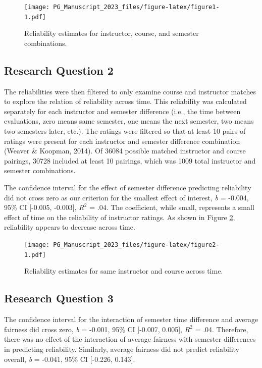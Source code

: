 \documentclass[
  man]{apa7}
\begin{document}
\begin{figure}
\centering
\texttt{[image: PG\_Manuscript\_2023\_files/figure-latex/figure1-1.pdf]}
\caption{\label{fig:figure1}Reliability estimates for instructor, course, and semester combinations.}
\end{figure}

\hypertarget{research-question-2-1}{%
\subsection{Research Question 2}\label{research-question-2-1}}

The reliabilities were then filtered to only examine course and
instructor matches to explore the relation of reliability across time.
This reliability was calculated separately for each instructor and
semester difference (i.e., the time between evaluations, zero means same
semester, one means the next semester, two means two semesters later,
etc.). The ratings were filtered so that at least 10 pairs of ratings
were present for each instructor and semester difference combination
(Weaver \& Koopman, 2014). Of 36084 possible matched instructor and
course pairings,
30728 included at
least 10 pairings, which was 1009 total instructor and
semester combinations.

The confidence interval for the effect of semester difference predicting
reliability did not cross zero as our criterion for the smallest effect
of interest, \emph{b} = -0.004, 95\% CI
{[}-0.005,
-0.003{]}, \(R^2\) =
.04.
The coefficient, while small, represents a small effect of time on the
reliability of instructor ratings. As shown in Figure
\ref{fig:figure2}, reliability appears to decrease across time.

\begin{figure}
\centering
\texttt{[image: PG\_Manuscript\_2023\_files/figure-latex/figure2-1.pdf]}
\caption{\label{fig:figure2}Reliability estimates for same instructor and course across time.}
\end{figure}

\hypertarget{research-question-3-1}{%
\subsection{Research Question 3}\label{research-question-3-1}}

The confidence interval for the interaction of semester time difference
and average fairness did cross zero, \emph{b} =
-0.001, 95\% CI
{[}-0.007,
0.005{]}, \(R^2\) =
.04.
Therefore, there was no effect of the interaction of average fairness
with semester differences in predicting reliability. Similarly, average
fairness did not predict reliability overall, \emph{b} =
-0.041, 95\% CI
{[}-0.226,
0.143{]}.
\end{document}
